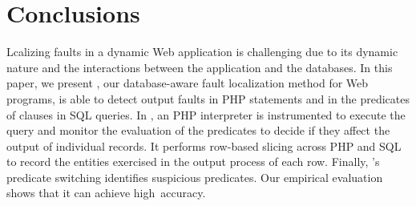 \section{Conclusions}


Lcalizing faults in a dynamic Web application is challenging
due to its dynamic nature and the interactions between the
application and the databases. In this paper, we present
{\tool}, our database-aware fault localization method for Web
programs, is able to detect output faults in PHP statements and
in the predicates of  clauses in SQL queries. In
{\tool}, an PHP interpreter is instrumented to execute the query and
monitor the evaluation of the predicates to decide if they
affect the output of individual records. It performs row-based slicing
across PHP and SQL to record the entities exercised in the output
process of each row. Finally, {\tool}'s predicate switching identifies
suspicious predicates. Our empirical evaluation shows that
it can achieve high~accuracy.

